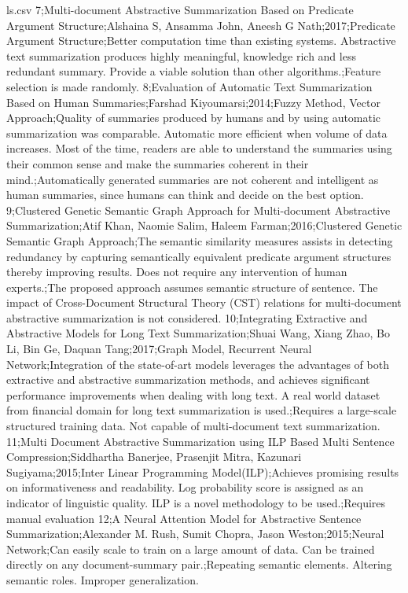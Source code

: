 \documentclass[11pt]{report}
\begin{document}
\begin{filecontents*}{ls.csv}
7;Multi-document Abstractive Summarization Based on Predicate Argument Structure;Alshaina S, Ansamma John, Aneesh G Nath;2017;Predicate Argument Structure;Better computation time than existing systems. Abstractive text summarization produces highly meaningful, knowledge rich and less redundant summary. Provide a viable solution than other algorithms.;Feature selection is made randomly.
8;Evaluation of Automatic Text Summarization Based on Human Summaries;Farshad Kiyoumarsi;2014;Fuzzy Method, Vector Approach;Quality of summaries produced by humans and by using automatic summarization was comparable. Automatic more efficient when volume of data increases. Most of the time, readers are able to understand the summaries using their common sense and make the summaries coherent in their mind.;Automatically generated summaries are not coherent and intelligent as human summaries, since humans can think and decide on the best option.
9;Clustered Genetic Semantic Graph Approach for Multi-document Abstractive Summarization;Atif Khan, Naomie Salim, Haleem Farman;2016;Clustered Genetic Semantic Graph Approach;The semantic similarity measures assists in detecting redundancy by capturing semantically equivalent predicate argument structures thereby improving results. Does not require any intervention of human experts.;The proposed approach assumes semantic structure of sentence. The impact of Cross-Document Structural Theory (CST) relations for multi-document abstractive summarization is not considered.
10;Integrating Extractive and Abstractive Models for Long Text Summarization;Shuai Wang, Xiang Zhao, Bo Li, Bin Ge, Daquan Tang;2017;Graph Model, Recurrent Neural Network;Integration of the state-of-art models leverages the advantages of both extractive and abstractive summarization methods, and achieves significant performance improvements when dealing with long text. A real world dataset from financial domain for long text summarization is used.;Requires a large-scale structured training data. Not capable of multi-document text summarization.
11;Multi Document Abstractive Summarization using ILP Based Multi Sentence Compression;Siddhartha Banerjee, Prasenjit Mitra, Kazunari Sugiyama;2015;Inter Linear Programming Model(ILP);Achieves promising results on informativeness and readability. Log probability score is assigned as an indicator of linguistic quality. ILP is a novel methodology to be used.;Requires manual evaluation
12;A Neural Attention Model for Abstractive Sentence Summarization;Alexander M. Rush, Sumit Chopra, Jason Weston;2015;Neural Network;Can easily scale to train on a large amount of data. Can be trained directly on any document-summary pair.;Repeating semantic elements. Altering semantic roles. Improper generalization.

\end{filecontents*}
\end{document}
